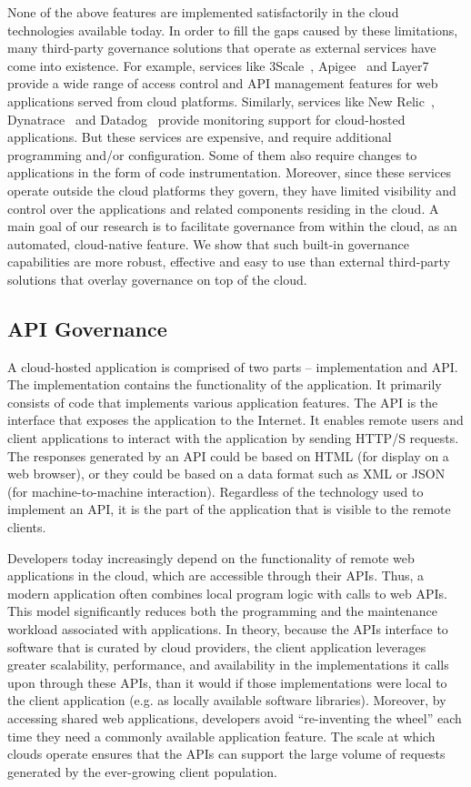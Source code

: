 None of the above features are implemented satisfactorily in the
cloud technologies available today.
In order to fill the gaps caused by these limitations, many third-party governance solutions that operate as external services
have come into existence. For example, services like 3Scale~\cite{3scale}, Apigee~\cite{apigee} and Layer7~\cite{layer7} provide a wide range
of access control and API management features for web applications served from cloud platforms. Similarly, 
services like New Relic~\cite{newrelic}, Dynatrace~\cite{dynatrace} and Datadog~\cite{datadog} provide monitoring support for cloud-hosted 
applications. But these services are expensive, and require additional programming and/or configuration.
Some of them also require changes to applications in the form of code instrumentation. Moreover,
since these services operate outside the cloud platforms they govern, they have limited visibility and control
over the applications and related components residing in the cloud. A main goal of our research is to facilitate governance
from within the cloud, as an automated, cloud-native feature. We show that such built-in governance capabilities are
more robust, effective and easy to use than external third-party solutions that overlay governance on top of the
cloud.

\subsection{API Governance}
A cloud-hosted application is comprised of two parts -- implementation and API. The implementation
contains the functionality of the application. It primarily consists of code that implements
various application features. The API is the interface that exposes the application to the
Internet. It enables remote users and client applications to interact with the application by sending
HTTP/S requests. The responses generated by an API could be based on HTML (for display on a web
browser), or they could be based on a data format such as XML or JSON (for machine-to-machine 
interaction). Regardless of the technology used to implement an API, it is the part of the application 
that is visible to the remote clients. 

Developers today
increasingly depend on the functionality of remote web applications in the cloud, which
are accessible through their APIs. Thus, a modern application 
often combines local program logic with calls to web APIs. 
This model significantly reduces both the programming and
the maintenance workload associated with applications. In theory, because
the APIs interface to software that is curated by cloud providers, the client
application leverages greater scalability, performance, 
and availability in the implementations it calls upon through these APIs, than
it would if those implementations were local to the client application
(e.g. as locally available software libraries).
Moreover, by accessing shared web applications, developers avoid ``re-inventing the
wheel'' each time they need a commonly available application feature. The scale at
which clouds operate ensures that the APIs can support the large volume
of requests generated by the ever-growing client population.

